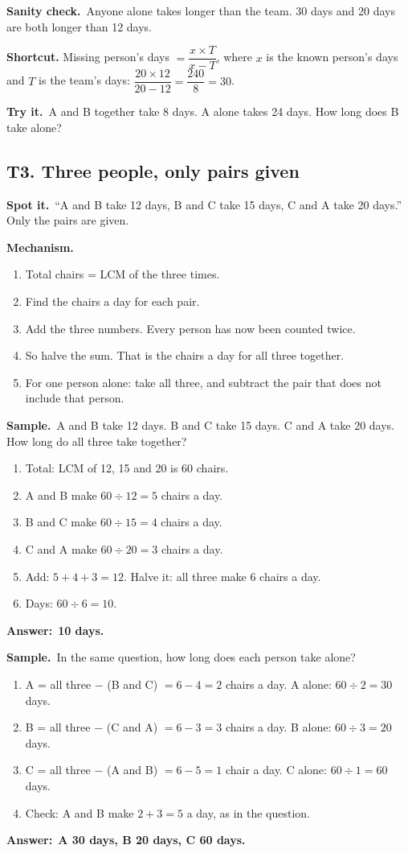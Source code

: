 \documentclass[11pt,a4paper]{article}
\let\oldsubsection\subsection
\renewcommand{\subsection}{\needspace{9\baselineskip}\oldsubsection}
\newcommand{\spot}{\textbf{\color{ember}Spot it.}\ }
\newcommand{\mech}{\textbf{\color{ember}Mechanism.}\ }
\newif\ifkeepsamp
\newcommand{\ans}[1]{\par\nopagebreak\noindent\textbf{\color{ember}Answer:}\ \textbf{#1}\par}
\newcommand{\samp}{\ifkeepsamp\needspace{4\baselineskip}\fi\textbf{\color{ember}Sample.}\ }
\newcommand{\sane}{\textbf{\color{slate}Sanity check.}\ }
\newcommand{\tryit}[1]{\textbf{\color{ember}Try it.}\ #1}
\begin{document}
\sane Anyone alone takes longer than the team. 30 days and 20 days are both longer than 12 days.

\textbf{Shortcut.} Missing person's days $=\dfrac{x \times T}{x-T}$, where $x$ is the known person's days and $T$ is the team's days: $\dfrac{20\times 12}{20-12}=\dfrac{240}{8}=30$.

\tryit A and B together take 8 days. A alone takes 24 days. How long does B take alone?

\subsection{T3. Three people, only pairs given}
\spot ``A and B take 12 days, B and C take 15 days, C and A take 20 days.'' Only the pairs are given.

\mech
\begin{enumerate}
\item Total chairs = LCM of the three times.
\item Find the chairs a day for each pair.
\item Add the three numbers. Every person has now been counted twice.
\item So halve the sum. That is the chairs a day for all three together.
\item For one person alone: take all three, and subtract the pair that does not include that person.
\end{enumerate}

\samp A and B take 12 days. B and C take 15 days. C and A take 20 days. How long do all three take together?
\begin{enumerate}
\item Total: LCM of 12, 15 and 20 is 60 chairs.
\item A and B make $60 \div 12 = 5$ chairs a day.
\item B and C make $60 \div 15 = 4$ chairs a day.
\item C and A make $60 \div 20 = 3$ chairs a day.
\item Add: $5 + 4 + 3 = 12$. Halve it: all three make 6 chairs a day.
\item Days: $60 \div 6 = 10$.
\end{enumerate}
\ans{10 days.}

\samp In the same question, how long does each person take alone?
\begin{enumerate}
\item A = all three $-$ (B and C) $= 6 - 4 = 2$ chairs a day. A alone: $60 \div 2 = 30$ days.
\item B = all three $-$ (C and A) $= 6 - 3 = 3$ chairs a day. B alone: $60 \div 3 = 20$ days.
\item C = all three $-$ (A and B) $= 6 - 5 = 1$ chair a day. C alone: $60 \div 1 = 60$ days.
\item Check: A and B make $2 + 3 = 5$ a day, as in the question.
\end{enumerate}
\ans{A 30 days, B 20 days, C 60 days.}
\end{document}
